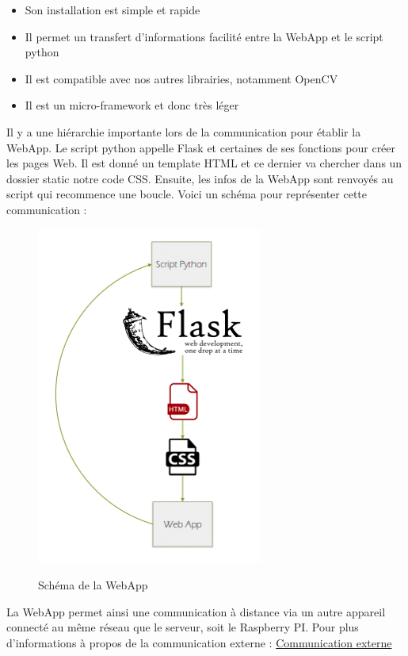 \documentclass[
	a4paper,									%
	11pt,										%
	twoside,									%
	openright,									%
	notitlepage,									%
	parskip=half,								%
]{scrreprt}										%
\begin{document}
\begin{itemize}
	\item Son installation est simple et rapide 
	\item Il permet un transfert d'informations facilité entre la WebApp et le script python
	\item Il est compatible avec nos autres librairies, notamment OpenCV
	\item Il est un micro-framework et donc très léger
\end{itemize}

Il y a une hiérarchie importante lors de la communication pour établir la WebApp. Le script python appelle Flask et certaines 
de ses fonctions pour créer les pages Web. Il est donné un template HTML et ce dernier va chercher dans un dossier static 
notre code CSS. Ensuite, les infos de la WebApp sont renvoyés au script qui recommence une boucle. 
Voici un schéma pour représenter cette communication : 

\begin{figure}[!h]
	\centering
	\includegraphics[scale=.8]{img/Schema_WebApp.png}
	\label{WebApp}
	\caption{Schéma de la WebApp}
\end{figure}

La WebApp permet ainsi une communication à distance via un autre appareil connecté au même réseau que le serveur, soit 
le Raspberry PI. Pour plus d'informations à propos de la communication externe : \href{run:./Comm_Externe}{Communication externe} \par
\end{document}
